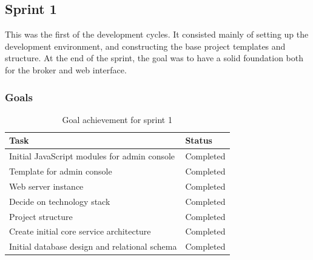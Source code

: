 \subsection{Sprint 1}
\label{subsec:project_lifecycle-development-sprint_1}

This was the first of the development cycles. It consisted mainly of setting up the development environment, and constructing the base project templates and structure. At the end of the sprint, the goal was to have a solid foundation both for the broker and web interface.

\subsubsection{Goals}
\label{subsec:project_lifecycle-development-sprint_1-goals}

\begin{center}
\begin{table}[ht!]
\small
\centering
\begin{tabular}{|p{10cm}|p{2cm}|}
\hline
\rowcolor{lightgray}
 \textbf{Task} & \textbf{Status} \\
\hline
\rowcolor{green!30}
 Initial JavaScript modules for admin console & Completed  \\
 \rowcolor{green!30}
 Template for admin console & Completed \\ 
 \rowcolor{green!30}
 Web server instance & Completed \\ 
 \rowcolor{green!30}
 Decide on technology stack & Completed \\ 
 \rowcolor{green!30}
 Project structure & Completed \\
 \rowcolor{green!30}
 Create initial core service architecture & Completed \\
 \rowcolor{green!30}
 Initial database design and relational schema & Completed \\
\hline
\end{tabular}
\caption{Goal achievement for sprint 1}
\label{tab:sprint 1, goals}
\end{table}
\end{center}

